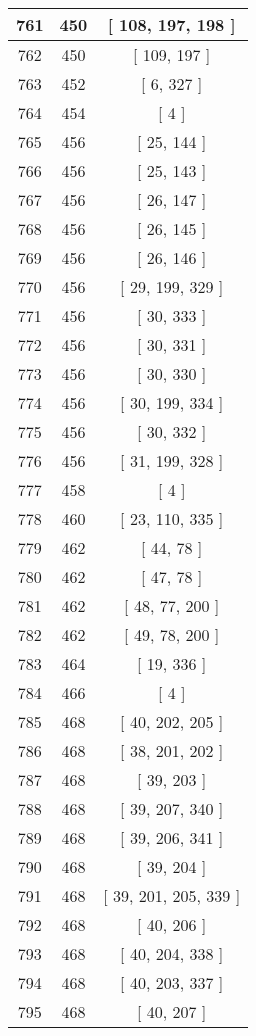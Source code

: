 \begin{center}
\begin{longtable}[H]{|| c c c ||}
761 & 450 & [ 108, 197, 198 ]
\\\hline
762 & 450 & [ 109, 197 ]
\\\hline
763 & 452 & [ 6, 327 ]
\\\hline
764 & 454 & [ 4 ]
\\\hline
765 & 456 & [ 25, 144 ]
\\\hline
766 & 456 & [ 25, 143 ]
\\\hline
767 & 456 & [ 26, 147 ]
\\\hline
768 & 456 & [ 26, 145 ]
\\\hline
769 & 456 & [ 26, 146 ]
\\\hline
770 & 456 & [ 29, 199, 329 ]
\\\hline
771 & 456 & [ 30, 333 ]
\\\hline
772 & 456 & [ 30, 331 ]
\\\hline
773 & 456 & [ 30, 330 ]
\\\hline
774 & 456 & [ 30, 199, 334 ]
\\\hline
775 & 456 & [ 30, 332 ]
\\\hline
776 & 456 & [ 31, 199, 328 ]
\\\hline
777 & 458 & [ 4 ]
\\\hline
778 & 460 & [ 23, 110, 335 ]
\\\hline
779 & 462 & [ 44, 78 ]
\\\hline
780 & 462 & [ 47, 78 ]
\\\hline
781 & 462 & [ 48, 77, 200 ]
\\\hline
782 & 462 & [ 49, 78, 200 ]
\\\hline
783 & 464 & [ 19, 336 ]
\\\hline
784 & 466 & [ 4 ]
\\\hline
785 & 468 & [ 40, 202, 205 ]
\\\hline
786 & 468 & [ 38, 201, 202 ]
\\\hline
787 & 468 & [ 39, 203 ]
\\\hline
788 & 468 & [ 39, 207, 340 ]
\\\hline
789 & 468 & [ 39, 206, 341 ]
\\\hline
790 & 468 & [ 39, 204 ]
\\\hline
791 & 468 & [ 39, 201, 205, 339 ]
\\\hline
792 & 468 & [ 40, 206 ]
\\\hline
793 & 468 & [ 40, 204, 338 ]
\\\hline
794 & 468 & [ 40, 203, 337 ]
\\\hline
795 & 468 & [ 40, 207 ]
\\\hline

\end{longtable}
\end{center}
